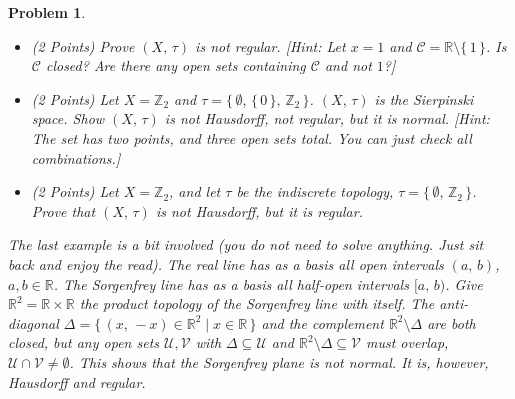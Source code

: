 \documentclass{article}
\theoremstyle{normal}
\newtheorem{problem}{Problem}
\begin{document}
\begin{problem}
\begin{itemize}
                $\tau$ to be all sets $\mathcal{U}\subseteq\mathbb{R}$ such
                that either $\mathcal{U}=\mathbb{R}$ or
                $0\notin\mathcal{U}$. This is the
                \textit{excluded point topology}. Prove $(X,\,\tau)$ is
                normal. [Hint: What do closed sets look like in this space?
                what do \textit{disjoint} closed sets $\mathcal{C}$ and
                $\mathcal{D}$ look like?]
            \item (2 Points) Prove $(X,\,\tau)$ is not regular.
                [Hint: Let $x=1$ and
                $\mathcal{C}=\mathbb{R}\setminus\{\,1\,\}$.
                Is $\mathcal{C}$ closed? Are there any open sets containing
                $\mathcal{C}$ and not $1$?]
            \item (2 Points) Let $X=\mathbb{Z}_{2}$ and
                $\tau=\big\{\,\emptyset,\,\{\,0\,\},\,\mathbb{Z}_{2}\,\big\}$.
                $(X,\,\tau)$ is the \textit{Sierpinski space}. Show
                $(X,\,\tau)$ is not Hausdorff, not regular, but it is
                normal. [Hint: The set has two points, and three open sets
                total. You can just check all combinations.]
            \item (2 Points)
                Let $X=\mathbb{Z}_{2}$, and let $\tau$ be the indiscrete
                topology, $\tau=\{\,\emptyset,\,\mathbb{Z}_{2}\,\}$. Prove
                that $(X,\,\tau)$ is not Hausdorff, but it is regular.
        \end{itemize}
        The last example is a bit involved (you do not need to solve anything.
        Just sit back and enjoy the read). The real line has as a basis all
        open intervals $(a,\,b)$, $a,b\in\mathbb{R}$. The
        \textit{Sorgenfrey line} has as a basis all half-open intervals
        $[a,\,b)$. Give $\mathbb{R}^{2}=\mathbb{R}\times\mathbb{R}$ the product
        topology of the Sorgenfrey line with itself. The anti-diagonal
        $\Delta=\{\,(x,\,-x)\in\mathbb{R}^{2}\;|\;x\in\mathbb{R}\,\}$ and the
        complement $\mathbb{R}^{2}\setminus\Delta$ are both closed, but any
        open sets $\mathcal{U},\mathcal{V}$ with $\Delta\subseteq\mathcal{U}$
        and $\mathbb{R}^{2}\setminus\Delta\subseteq\mathcal{V}$ must overlap,
        $\mathcal{U}\cap\mathcal{V}\ne\emptyset$. This shows that the Sorgenfrey
        plane is \textit{not} normal. It is, however, Hausdorff and regular.
    \end{problem}
    \color{black}
    \clearpage
    \color{blue}
\end{document}
